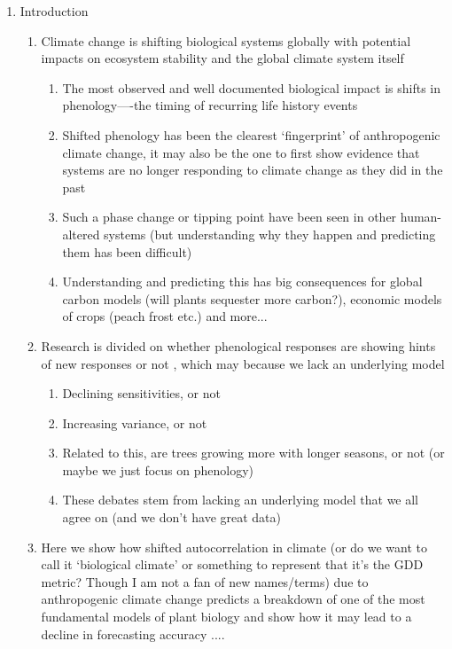 \documentclass[11pt]{article}
\begin{document}
\begin{enumerate}
\item Introduction
\begin{enumerate}
\item Climate change is shifting biological systems globally with potential impacts on ecosystem stability and the global climate system itself \citep{richardson2023earth}
\begin{enumerate}
\item The most observed and well documented biological impact is shifts in phenology----the timing of recurring life history events \citep{ipcc2022,Menzel1999,Root:2003kl}
\item Shifted phenology has been the clearest `fingerprint' of anthropogenic climate change, it may also be the one to first show evidence that systems are no longer responding to climate change as they did in the past \citep{piao2019plant,vitasse2022great}
\item Such a phase change or tipping point \citep{Dakos2013} have been seen in other human-altered systems (but understanding why they happen and predicting them has been difficult) \citep{Chavez2003}
\item Understanding and predicting this has big consequences for global carbon models (will plants sequester more carbon?), economic models of crops (peach frost etc.) and more... \citep{chamberlain2021climate,zohner2020late,lamichhane2021rising}
\end{enumerate}
\item Research is divided on whether phenological responses are showing hints of new responses \citep{fu2015declining,gusewell2017changes} or not \citep{wolkovich2021simple}, which may because we lack an underlying model
\begin{enumerate}
\item Declining sensitivities, or not
\item Increasing variance, or not
\item Related to this, are trees growing more with longer seasons, or not (or maybe we just focus on phenology) \citep{dow2022warm,keenan2014net}
\item These debates stem from lacking an underlying model that we all agree on (and we don't have great data)
\end{enumerate}
\item Here we show how shifted autocorrelation in climate (or do we want to call it `biological climate' or something to represent that it's the GDD metric? Though I am not a fan of new names/terms) due to anthropogenic climate change predicts a breakdown of one of the most fundamental models of plant biology and show how it may lead to a decline in forecasting accuracy .... 

\end{enumerate}
\end{enumerate}
\end{document}
